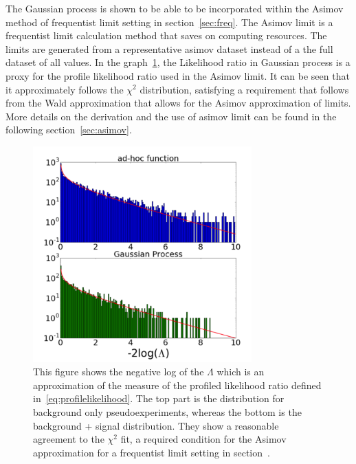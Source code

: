     The Gaussian process is shown to be able to be incorporated within the Asimov method of frequentist limit setting in section~\ref{sec:freq}. The Asimov limit is a frequentist limit calculation method that saves on computing resources. The limits are generated from a representative asimov dataset instead of a the full dataset of all values.
    In the graph~\ref{fig:chi2}, the Likelihood ratio in Gaussian process is a proxy for the profile likelihood ratio used in the Asimov limit. It can be seen that it approximately follows the $\chi^{2}$ distribution, satisfying a requirement that follows from the Wald approximation that allows for the Asimov approximation of limits.
    More details on the derivation and the use of asimov limit can be found in the following section~\ref{sec:asimov}.

    \begin{figure}[!htb]
        \begin{center}
            \includegraphics[width=0.75\textwidth]{figures/chapter_analysismethod/chi2}
                \caption{
                This figure shows the negative log of the $\Lambda$ which is an approximation of the measure of the profiled likelihood ratio defined in~\ref{eq:profilelikelihood}. The top part is the distribution for background only pseudoexperiments, whereas the bottom is the background + signal distribution. They show a reasonable agreement to the $\chi^{2}$ fit, a required condition for the Asimov approximation for a frequentist limit setting in
            section~\cite{frate2017modelling}. }
            \label{fig:chi2}
        \end{center}
    \end{figure}
    \FloatBarrier

